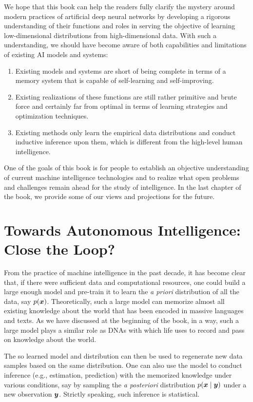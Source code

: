 \documentclass[../../book-main.tex]{subfiles}
\begin{document}
We hope that this book can help the readers fully clarify the mystery around modern practices of artificial deep neural networks by developing a rigorous understanding of their functions and roles in serving the objective of learning low-dimensional distributions from high-dimensional data. With such a understanding, we should have become aware of both capabilities and limitations of existing AI models and systems: 
\begin{enumerate}
    \item Existing models and systems are short of being complete in terms of a memory system that is capable of self-learning and self-improving.
    \item Existing realizations of these functions are still rather primitive and brute force and certainly far from optimal in terms of learning strategies and optimization techniques. 
    \item Existing methods only learn the empirical data distributions and conduct inductive inference upon them, which is different from the high-level human intelligence.
\end{enumerate} 

One of the goals of this book is for people to establish an objective understanding of current machine intelligence technologies and to realize what open problems and challenges remain ahead for the study of intelligence. In the last chapter of the book, we provide some of our views and projections for the future. 

\section{Towards Autonomous Intelligence: Close the Loop?}
From the practice of machine intelligence in the past decade, it has become clear that, if there were sufficient data and computational resources, one could build a large enough model and pre-train it to learn the {\em a priori} distribution of all the data, say $p(\bm{x})$. Theoretically, such a large model can memorize almost all existing knowledge about the world that has been encoded in massive languages and texts. As we have discussed at the beginning of the book, in a way, such a large model plays a similar role as DNAs with which life uses to record and pass on knowledge about the world.  

The so learned model and distribution can then be used to regenerate new data samples based on the same distribution. One can also use the model to conduct inference (e.g., estimation, prediction) with the memorized knowledge under various conditions, say by sampling the {\em a posteriori} distribution $p(\bm{x}\mid \bm{y})$ under a new observation $\bm{y}$. Strictly speaking, such inference is statistical. 
\end{document}

